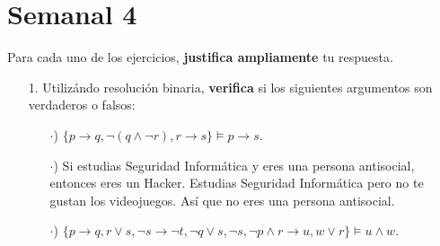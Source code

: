 \documentclass{article}
\begin{document}
\section*{\LARGE{Semanal 4}}
Para cada uno de los ejercicios, \textbf{justifica ampliamente} tu respuesta.
\begin{itemize}
\item[1.] Utilizándo resolución binaria, \textbf{verifica} si los siguientes
  argumentos son verdaderos o falsos:
  \begin{itemize}
  \item[$\cdot$)] $\{p \rightarrow q, \neg (q \land \neg r), r \rightarrow s\} \models p \rightarrow s$.
  \item[$\cdot$)] Si estudias Seguridad Informática y eres una persona antisocial, entonces eres un
    Hacker. Estudias Seguridad Informática pero no te gustan los videojuegos. Así que
    no eres una persona antisocial.
  \item[$\cdot$)] $\{p \rightarrow q, r \lor s, \neg s \rightarrow \neg t, \neg q \lor s, \neg s,
    \neg p \land r \rightarrow u, w \lor r \} \models u \land w$.
  \end{itemize}
  

\end{itemize}
\end{document}
